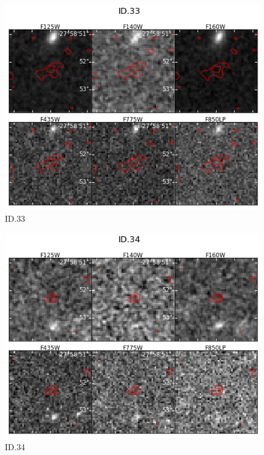 \begin{figure}[tbp]
\centering \includegraphics[width=160mm]{Matched/ASPECS_Cutout_32.jpg}
\caption{ID.33}
\label{fig:Match_Three}
\end{figure}

\begin{figure}[tbp]
\centering \includegraphics[width=160mm]{Matched/ASPECS_Cutout_33.jpg}
\caption{ID.34}
\label{fig:Match_Three}
\end{figure}

